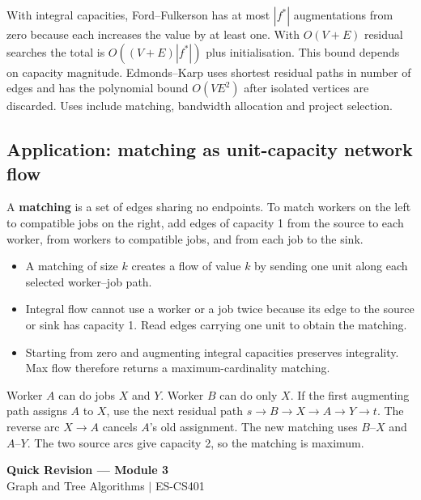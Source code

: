 \documentclass[12pt,a4paper]{article}
\begin{document}
With integral capacities, Ford--Fulkerson has at most $|f^*|$ augmentations from zero because each increases the value by at least one. With $O(V+E)$ residual searches the total is $O((V+E)|f^*|)$ plus initialisation. This bound depends on capacity magnitude. Edmonds--Karp uses shortest residual paths in number of edges and has the polynomial bound $O(VE^2)$ after isolated vertices are discarded. Uses include matching, bandwidth allocation and project selection.

\subsection{Application: matching as unit-capacity network flow}
A \textbf{matching} is a set of edges sharing no endpoints. To match workers on the left to compatible jobs on the right, add edges of capacity 1 from the source to each worker, from workers to compatible jobs, and from each job to the sink.
\begin{itemize}[leftmargin=*, itemsep=3pt]
  \item A matching of size $k$ creates a flow of value $k$ by sending one unit along each selected worker--job path.
  \item Integral flow cannot use a worker or a job twice because its edge to the source or sink has capacity 1. Read edges carrying one unit to obtain the matching.
  \item Starting from zero and augmenting integral capacities preserves integrality. Max flow therefore returns a maximum-cardinality matching.
\end{itemize}
\begin{tcolorbox}[examplebox, title={Why rerouting beats an early assignment}]
Worker $A$ can do jobs $X$ and $Y$. Worker $B$ can do only $X$. If the first augmenting path assigns $A$ to $X$, use the next residual path $s\to B\to X\to A\to Y\to t$. The reverse arc $X\to A$ cancels $A$'s old assignment. The new matching uses $B$--$X$ and $A$--$Y$. The two source arcs give capacity 2, so the matching is maximum.
\end{tcolorbox}

\newpage
\begin{center}
  {\large\bfseries\color{myred} Quick Revision --- Module 3}\\[3pt]
  {\small\color{mydark} Graph and Tree Algorithms $|$ ES-CS401}
\end{center}
\noindent{\color{myred}\rule{\linewidth}{1.2pt}}\par\vspace{4pt}
\end{document}
